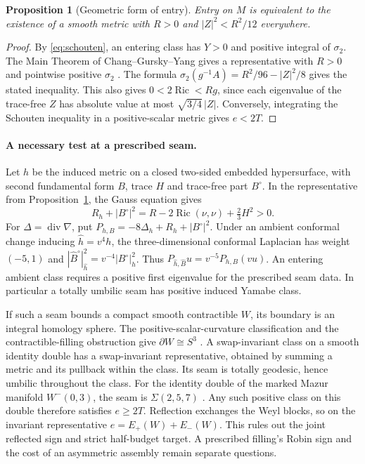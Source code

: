 \documentclass[11pt,letterpaper]{article}
\numberwithin{equation}{section}
\newtheorem{proposition}[theorem]{Proposition}
\DeclareMathOperator{\Ric}{Ric}
\begin{document}
\begin{proposition}[Geometric form of entry]\label{prop:entry}
Entry on \(M\) is equivalent to the existence of a smooth metric with
\(R>0\) and \(|Z|^2<R^2/12\) everywhere.
\end{proposition}
\begin{proof}
By \eqref{eq:schouten}, an entering class has \(Y>0\) and positive
integral of \(\sigma_2\). The Main Theorem of Chang--Gursky--Yang gives
a representative with \(R>0\) and pointwise positive \(\sigma_2\)
\cite{ChangGurskyYang2002PositiveRicci}. The formula
\(\sigma_2(g^{-1}A)=R^2/96-|Z|^2/8\) gives the stated inequality.
This also gives \(0<2\Ric<Rg\), since each eigenvalue of the trace-free \(Z\) has absolute value at most \(\sqrt{3/4}\,|Z|\). Conversely, integrating the Schouten inequality in a positive-scalar metric gives \(e<2T\).
\end{proof}

\paragraph{A necessary test at a prescribed seam.}
Let \(h\) be the induced metric on a closed two-sided embedded
hypersurface, with second fundamental form \(B\), trace \(H\) and
trace-free part \(B^\circ\). In the representative from
Proposition~\ref{prop:entry}, the Gauss equation gives
\[
 R_h+|B^\circ|^2=R-2\Ric(\nu,\nu)+\tfrac23 H^2>0 .
\]
For \(\Delta=\operatorname{div}\nabla\), put
\(P_{h,B}=-8\Delta_h+R_h+|B^\circ|^2\).
Under an ambient conformal change inducing \(\hat h=v^4h\),
the three-dimensional conformal Laplacian has weight \((-5,1)\) and
\(|\hat B^\circ|_{\hat h}^2=v^{-4}|B^\circ|_h^2\). Thus
\(P_{\hat h,\hat B}u=v^{-5}P_{h,B}(vu)\). An entering ambient class requires a positive first
eigenvalue for the prescribed seam data. In particular a totally
umbilic seam has positive induced Yamabe class.

If such a seam bounds a compact smooth contractible \(W\), its boundary
is an integral homology sphere. The positive-scalar-curvature
classification and the contractible-filling obstruction give
\(\partial W\cong S^3\)
\cite[Corollary 2.3 and Proposition 4.2]{ChodoshMaximoMukherjee2024Complete}.
A swap-invariant class on a smooth identity double has a swap-invariant
representative, obtained by summing a metric and its pullback within the
class. Its seam is totally geodesic, hence umbilic throughout the class.
For the identity double of the marked Mazur manifold \(W^-(0,3)\),
the seam is \(\Sigma(2,5,7)\)
\cite[Proposition 1 and Theorem 2(1)]{AkbulutKirby1979Mazur}%
\cite[Figure 37 and Theorem 3.3]{Isoshima2025MazurDoubles}.
Any such positive class on this double therefore satisfies \(e\ge 2T\). Reflection exchanges the Weyl
blocks, so on the invariant representative \(e=E_+(W)+E_-(W)\).
This rules out the joint reflected sign and strict half-budget target.
A prescribed filling's Robin sign and the cost of an asymmetric
assembly remain separate questions.
\end{document}
